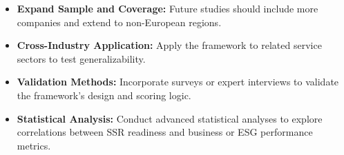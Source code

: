 \begin{itemize}
    \item \textbf{Expand Sample and Coverage:}  
    Future studies should include more companies and extend to non-European regions.

    \item \textbf{Cross-Industry Application:}  
    Apply the framework to related service sectors to test generalizability.

    \item \textbf{Validation Methods:}  
    Incorporate surveys or expert interviews to validate the framework's design and scoring logic.

    \item \textbf{Statistical Analysis:}  
    Conduct advanced statistical analyses to explore correlations between SSR readiness and business or ESG performance metrics.
\end{itemize}
